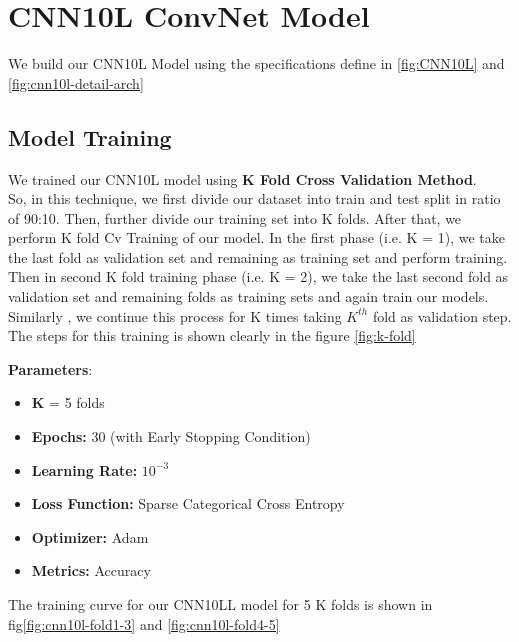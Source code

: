 \section{CNN10L ConvNet Model}
 We build our CNN10L Model using the specifications define in \ref{fig:CNN10L} and \ref{fig:cnn10l-detail-arch} 
 
\subsection{Model Training}
We trained our CNN10L model using \textbf{K Fold Cross Validation Method}. \\

So, in this technique, we first divide our dataset into train and test split in ratio of 90:10. Then, further divide our training set into K folds. After that, we perform K fold Cv Training of our model.
In the first phase (i.e. K = 1), we take the last fold as validation set and remaining as training set and perform training. Then in second K fold training phase (i.e. K = 2), we take the last second fold as validation set and remaining folds as training sets and again train our models. Similarly , we continue this process for K times taking $K^{th}$ fold as validation step. The steps for this training is shown clearly in the figure \ref{fig:k-fold}\par\vspace{1em}

\textbf{Parameters}:
\begin{itemize}
    \item \textbf{K }= 5 folds
    \item \textbf{Epochs:} 30 (with Early Stopping Condition)
    \item \textbf{Learning Rate:} $10^{-3}$
    \item \textbf{Loss Function:} Sparse Categorical Cross Entropy
    \item \textbf{Optimizer:} Adam
    \item \textbf{Metrics:} Accuracy
\end{itemize}

The training curve for our CNN10LL model for 5 K folds is shown in fig\ref{fig:cnn10l-fold1-3} and \ref{fig:cnn10l-fold4-5}\par\vspace{1em}

